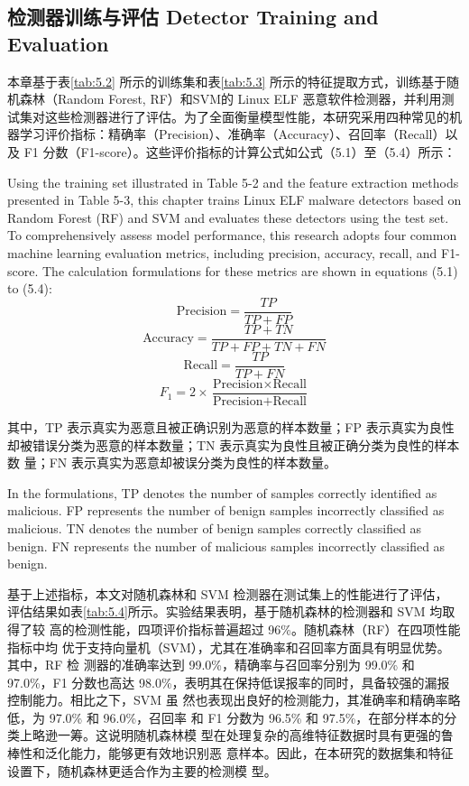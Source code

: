 \subsection{检测器训练与评估  Detector Training and Evaluation}

本章基于表\ref{tab:5.2} 所示的训练集和表\ref{tab:5.3} 所示的特征提取方式，训练基于随机森林（Random Forest, RF）和SVM的 Linux ELF 恶意软件检测器，并利用测试集对这些检测器进行了评估。为了全面衡量模型性能，本研究采用四种常见的机器学习评价指标：精确率（Precision）、准确率（Accuracy）、召回率（Recall）以及 F1 分数（F1-score）。这些评价指标的计算公式如公式（5.1）至（5.4）所示：

Using the training set illustrated in Table 5-2 and the feature extraction methods presented in Table 5-3, this chapter trains Linux ELF malware detectors based on Random Forest (RF) and SVM and evaluates these detectors using the test set. To comprehensively assess model performance, this research adopts four common machine learning evaluation metrics, including precision, accuracy, recall, and F1-score. The calculation formulations for these metrics are shown in equations (5.1) to (5.4):
\begin{equation}
	\text{Precision} = \frac{TP}{TP + FP}
	\tag{5.1}
\end{equation}
\begin{equation}
	\text{Accuracy} = \frac{TP + TN}{TP + FP + TN + FN}
	\tag{5.2}
\end{equation}
\begin{equation}
	\text{Recall} = \frac{TP}{TP + FN}
	\tag{5.3}
\end{equation}
\begin{equation}
	F_1 = 2 \times \frac{\text{Precision} \times \text{Recall}}{\text{Precision} + \text{Recall}}
	\tag{5.4}
\end{equation}

其中，TP 表示真实为恶意且被正确识别为恶意的样本数量；FP 表示真实为良性
却被错误分类为恶意的样本数量；TN 表示真实为良性且被正确分类为良性的样本数
量；FN 表示真实为恶意却被误分类为良性的样本数量。

In the formulations, TP denotes the number of samples correctly identified as malicious. FP represents the number of benign samples incorrectly classified as malicious. TN denotes the number of benign samples correctly classified as benign. FN represents the number of malicious samples incorrectly classified as benign.

基于上述指标，本文对随机森林和 SVM 检测器在测试集上的性能进行了评估，
评估结果如表\ref{tab:5.4}所示。实验结果表明，基于随机森林的检测器和 SVM 均取得了较
高的检测性能，四项评价指标普遍超过 96\%。随机森林（RF）在四项性能指标中均
优于支持向量机（SVM），尤其在准确率和召回率方面具有明显优势。其中，RF 检
测器的准确率达到 99.0\%，精确率与召回率分别为 99.0\% 和 97.0\%，F1 分数也高达
98.0\%，表明其在保持低误报率的同时，具备较强的漏报控制能力。相比之下，SVM 虽
然也表现出良好的检测能力，其准确率和精确率略低，为 97.0\% 和 96.0\%，召回率
和 F1 分数为 96.5\% 和 97.5\%，在部分样本的分类上略逊一筹。这说明随机森林模
型在处理复杂的高维特征数据时具有更强的鲁棒性和泛化能力，能够更有效地识别恶
意样本。因此，在本研究的数据集和特征设置下，随机森林更适合作为主要的检测模
型。

